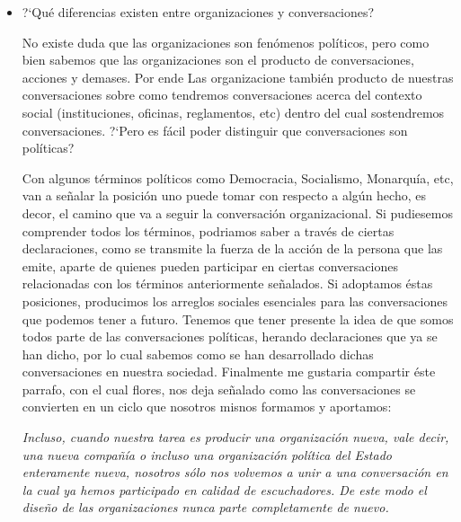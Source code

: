 \begin{itemize}
	\item ?`Qu\'e diferencias existen entre organizaciones y conversaciones?

No existe duda que las organizaciones son fen\'omenos pol\'iticos, pero como bien sabemos que las organizaciones
son el producto de conversaciones, acciones y demases. Por ende Las organizacione tambi\'en producto de nuestras
conversaciones sobre como tendremos conversaciones acerca del contexto social (instituciones, oficinas, reglamentos,
etc) dentro del cual sostendremos conversaciones.
?`Pero es f\'acil poder distinguir que conversaciones son pol\'iticas?

Con algunos t\'erminos pol\'iticos como Democracia, Socialismo, Monarqu\'ia, etc, van a se\~nalar la posici\'on uno puede tomar con
respecto a alg\'un hecho, es decor, el camino que va a seguir la conversaci\'on organizacional. Si pudiesemos comprender todos los
t\'erminos, podriamos saber a trav\'es de ciertas declaraciones, como se transmite la fuerza de la acci\'on de la persona que las
emite, aparte de quienes pueden participar en ciertas conversaciones relacionadas con los t\'erminos anteriormente se\~nalados.
Si adoptamos \'estas posiciones, producimos los arreglos sociales esenciales para las conversaciones que podemos tener a futuro.
Tenemos que tener presente la idea de que somos todos parte de las conversaciones pol\'iticas, herando declaraciones que ya se han
dicho, por lo cual sabemos como se han desarrollado dichas conversaciones en nuestra sociedad.
Finalmente me gustaria compartir \'este parrafo, con el cual flores, nos deja se\~nalado como las conversaciones se convierten en un
ciclo que nosotros misnos formamos y aportamos:\\

\begin{center}
\emph{Incluso, cuando nuestra tarea es producir una organizaci\'on nueva, vale decir, una nueva compa\~n\'ia
o incluso una organizaci\'on pol\'itica del Estado enteramente nueva, nosotros s\'olo nos volvemos a unir a una conversaci\'on en la cual ya hemos
participado en calidad de escuchadores. De este modo el dise\~no de las organizaciones nunca parte completamente de nuevo.}
\end{center}


\end{itemize}
